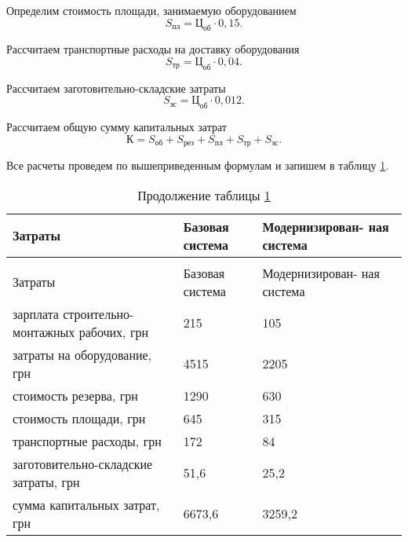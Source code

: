         Определим стоимость площади, занимаемую оборудованием
        \begin{equation}
            S_\text{пл} = \text{Ц}_\text{об} \cdot 0,15.
        \end{equation}

        Рассчитаем транспортные расходы на доставку оборудования
        \begin{equation}
            S_\text{тр} = \text{Ц}_\text{об} \cdot 0,04.
        \end{equation}

        Рассчитаем заготовительно-складские затраты
        \begin{equation}
            S_\text{зс} = \text{Ц}_{об} \cdot 0,012. 
        \end{equation}

        Рассчитаем общую сумму капитальных затрат
        \begin{equation}
            К = S_\text{об} + S_\text{рез} +
                S_\text{пл} + S_\text{тр} + S_\text{зс}. 
        \end{equation}

        Все расчеты проведем по вышеприведенным формулам и запишем в таблицу
        \ref{table:capital-cost}.

        \begin{longtable}{|p{8cm}|p{3cm}|p{4cm}|}
            \caption{Капитальные затраты на оборудование
                \label{table:capital-cost}}\\
            \hline
            Затраты & Базовая система & Модернизирован- ная система\\
            \hline
            \endfirsthead
            \caption*{Продолжение таблицы \ref{table:capital-cost}}\\
            \hline
            Затраты & Базовая система & Модернизирован- ная система\\
            \endhead
            \hline
            зарплата строительно-монтажных рабочих, грн & 215 & 105\\
            \hline
            затраты на оборудование, грн & 4515 & 2205\\
            \hline
            стоимость резерва, грн & 1290 & 630\\
            \hline
            стоимость площади, грн & 645 & 315\\
            \hline
            транспортные расходы, грн & 172 & 84\\
            \hline
            заготовительно-складские затраты, грн & 51,6 & 25,2\\
            \hline
            сумма капитальных затрат, грн & 6673,6 & 3259,2\\
            \hline
        \end{longtable}

